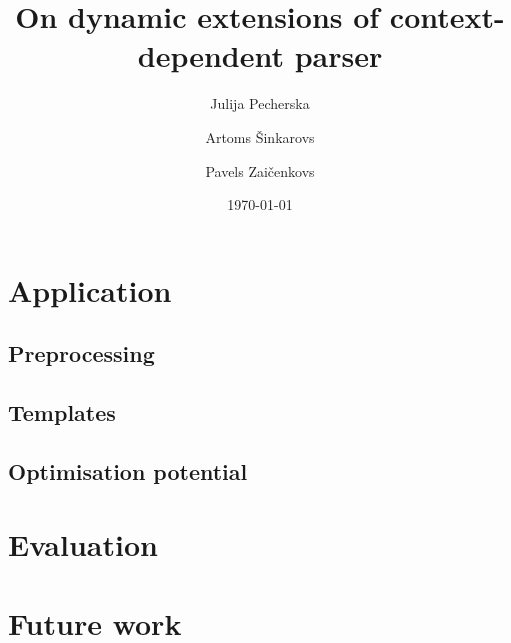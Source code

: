\documentclass[a4paper, draft]{article}
\author{Julija Pecherska \and Artoms \v{S}inkarovs \and Pavels Zai\v{c}enkovs}
\title{On dynamic extensions of context-dependent parser}
\date{\today}
\begin{document}
\maketitle

\begin{abstract}
\end{abstract}







\section{Application}
\subsection{Preprocessing}
\subsection{Templates}
\subsection{Optimisation potential}

\section{Evaluation}

\section{Future work}



\end{document}
